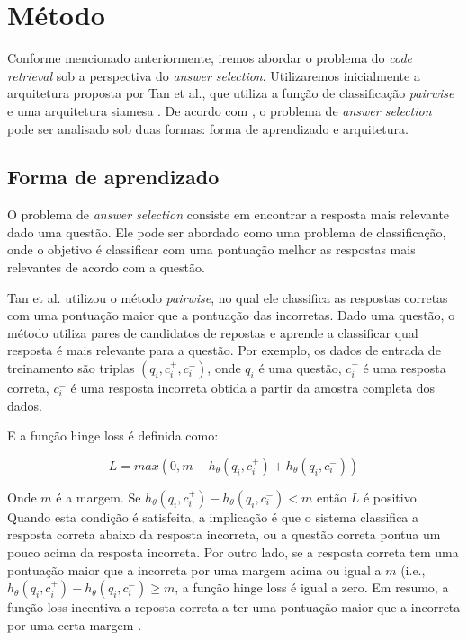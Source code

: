 \documentclass[12pt]{article}
\begin{document}
\section{Método} \label{sec:metodo}

Conforme mencionado anteriormente, iremos abordar o problema do \textit{code retrieval} sob a perspectiva do \textit{answer selection}. Utilizaremos inicialmente
a arquitetura proposta por Tan et al., que utiliza a função de classificação \textit{pairwise} e uma arquitetura siamesa \cite{lai-etal-2018-review}. De acordo com 
\cite{lai-etal-2018-review}, o problema de \textit{answer selection} pode ser analisado sob duas formas: forma de aprendizado e arquitetura.

\subsection{Forma de aprendizado}

O problema de \textit{answer selection} consiste em encontrar a resposta mais relevante dado uma questão. Ele pode ser abordado como uma problema de classificação, onde
o objetivo é classificar com uma pontuação melhor as respostas mais relevantes de acordo com a questão.

Tan et al. utilizou o método \textit{pairwise}, no qual ele classifica as respostas corretas com uma pontuação maior que a pontuação das incorretas. Dado uma questão,
o método utiliza pares de candidatos de repostas e aprende a classificar qual resposta é mais relevante para a questão. Por exemplo, os dados de entrada de treinamento
são triplas $(q_{i}, c_{i}^{+}, c_{i}^{-})$, onde $q_{i}$ é uma questão, $c_{i}^{+}$ é uma resposta correta, $c_{i}^{-}$ é uma resposta incorreta obtida a partir da amostra completa dos dados. 

E a função hinge loss é definida como:

\begin{equation}
L = max(0, m - h_{\theta}(q_{i}, c_{i}^{+}) + h_{\theta}(q_{i}, c_{i}^{-}))   
\end{equation}


Onde $m$ é a margem. Se $h_{\theta}(q_{i}, c_{i}^{+}) - h_{\theta}(q_{i}, c_{i}^{-}) < m$ então $L$ é positivo. Quando esta condição é satisfeita, a implicação é que o sistema classifica a resposta correta abaixo da resposta incorreta, ou a questão correta pontua um pouco acima da resposta incorreta. Por outro lado, se a resposta correta tem uma pontuação maior que a incorreta por uma margem acima ou igual a $m$ (i.e., $h_{\theta}(q_{i}, c_{i}^{+}) - h_{\theta}(q_{i}, c_{i}^{-}) \geq m$, a função hinge loss é igual a zero. Em resumo, a função loss incentiva a reposta correta a ter uma pontuação maior que a incorreta por uma certa margem \cite{lai-etal-2018-review}.
\end{document}
